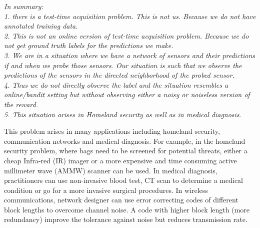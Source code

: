 \documentclass{article}
\begin{document}



{\it In summary: \\
	1. there is a test-time acquisition problem. This is not us. Because we do not have annotated training data. \\
	2. This is not an online version of test-time acquisition problem. Because we do not get ground truth labels for the predictions we make.\\
	3. We are in a situation where we have a network of sensors and their predictions if and when we probe those sensors. Our situation is such that we observe the predictions of the sensors in the directed neighborhood of the probed sensor.\\
	4. Thus we do not directly observe the label and the situation resembles a online/bandit setting but without observing either a noisy or noiseless version of the reward.\\
	5. This situation arises in Homeland security as well as in medical diagnosis.}

This problem arises in many applications including homeland security, communication networks and medical diagnosis. For example, in the homeland security problem, where bags need to be screened for potential threats, either a cheap Infra-red (IR) imager or a more expensive and time consuming active millimeter wave (AMMW) scanner can be used. In medical diagnosis, practitioners can use non-invasive blood test, CT scan to determine a medical condition or go for a more invasive surgical procedures. In wireless communications, network designer can use error correcting codes of different block lengths to overcome channel noise. A code with higher block length (more redundancy)  improve the tolerance against noise but reduces transmission rate. 
     
\end{document}

